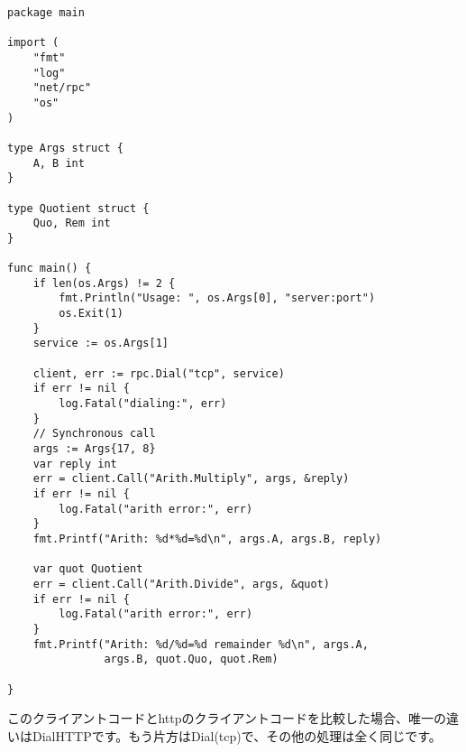 \begin{lstlisting}[numbers=none]
package main

import (
    "fmt"
    "log"
    "net/rpc"
    "os"
)

type Args struct {
    A, B int
}

type Quotient struct {
    Quo, Rem int
}

func main() {
    if len(os.Args) != 2 {
        fmt.Println("Usage: ", os.Args[0], "server:port")
        os.Exit(1)
    }
    service := os.Args[1]

    client, err := rpc.Dial("tcp", service)
    if err != nil {
        log.Fatal("dialing:", err)
    }
    // Synchronous call
    args := Args{17, 8}
    var reply int
    err = client.Call("Arith.Multiply", args, &reply)
    if err != nil {
        log.Fatal("arith error:", err)
    }
    fmt.Printf("Arith: %d*%d=%d\n", args.A, args.B, reply)

    var quot Quotient
    err = client.Call("Arith.Divide", args, &quot)
    if err != nil {
        log.Fatal("arith error:", err)
    }
    fmt.Printf("Arith: %d/%d=%d remainder %d\n", args.A,
               args.B, quot.Quo, quot.Rem)

}
\end{lstlisting}

このクライアントコードとhttpのクライアントコードを比較した場合、唯一の違いはDialHTTPです。もう片方はDial(tcp)で、その他の処理は全く同じです。


